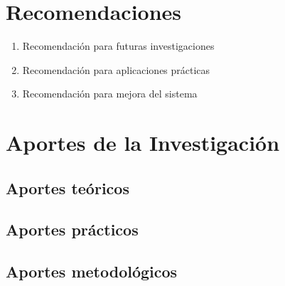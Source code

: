 \documentclass[12pt, letterpaper, oneside]{book}
\begin{document}
\section{Recomendaciones}
\begin{enumerate}
    \item Recomendación para futuras investigaciones
    \item Recomendación para aplicaciones prácticas
    \item Recomendación para mejora del sistema
\end{enumerate}

\section{Aportes de la Investigación}
\subsection{Aportes teóricos}
\subsection{Aportes prácticos}
\subsection{Aportes metodológicos}

\printbibliography[title={REFERENCIAS BIBLIOGRÁFICAS}, heading=bibintoc]
\end{document}
